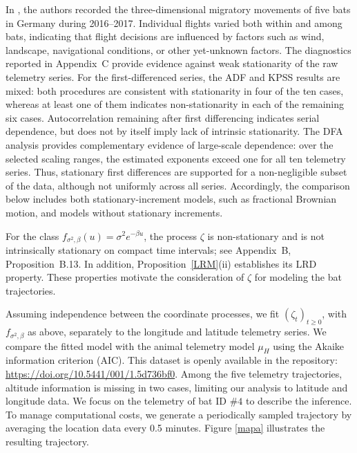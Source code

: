 \documentclass[preprint,12pt,authoryear]{elsarticle}
\begin{document}
In \cite{mara}, the authors recorded the three-dimensional migratory movements of five bats in Germany during 2016–2017. Individual flights varied both within and among bats, indicating that flight decisions are influenced by factors such as wind, landscape, navigational conditions, or other yet-unknown factors. The diagnostics reported in Appendix~C provide evidence against weak
stationarity of the raw telemetry series. For the first-differenced series,
the ADF and KPSS results are mixed: both procedures are consistent with
stationarity in four of the ten cases, whereas at least one of them indicates
non-stationarity in each of the remaining six cases. Autocorrelation remaining
after first differencing indicates serial dependence, but does not by itself
imply lack of intrinsic stationarity. The DFA analysis provides complementary evidence of large-scale dependence:
over the selected scaling ranges, the estimated exponents exceed one for all
ten telemetry series. Thus, stationary first differences are supported for a
non-negligible subset of the data, although not uniformly across all series.
Accordingly, the comparison below includes both stationary-increment models,
such as fractional Brownian motion, and models without stationary increments.

For the class \(f_{\sigma^2,\beta}(u)=\sigma^2e^{-\beta u}\), the process
\(\zeta\) is non-stationary and is not intrinsically stationary on compact
time intervals; see Appendix~B, Proposition~B.13. In addition,
Proposition~\ref{LRM}(ii) establishes its LRD property. These properties
motivate the consideration of \(\zeta\) for modeling the bat trajectories.

Assuming independence between the coordinate processes, we fit
\((\zeta_t)_{t\geq0}\), with \(f_{\sigma^2,\beta}\) as above, separately
to the longitude and latitude telemetry series. We compare the fitted model
with the animal telemetry model \(\mu_H\) using the Akaike information
criterion (AIC). This dataset is openly available in the repository: \url{https://doi.org/10.5441/001/1.5d736bf0}. Among the five telemetry trajectories, altitude information is missing in two cases, limiting our analysis to latitude and longitude data. We focus on the telemetry of bat ID $\#4$ to describe the inference. To manage computational costs, we generate a periodically sampled trajectory by averaging the location data every 0.5 minutes. Figure \ref{mapa} illustrates the resulting trajectory.
\end{document}
